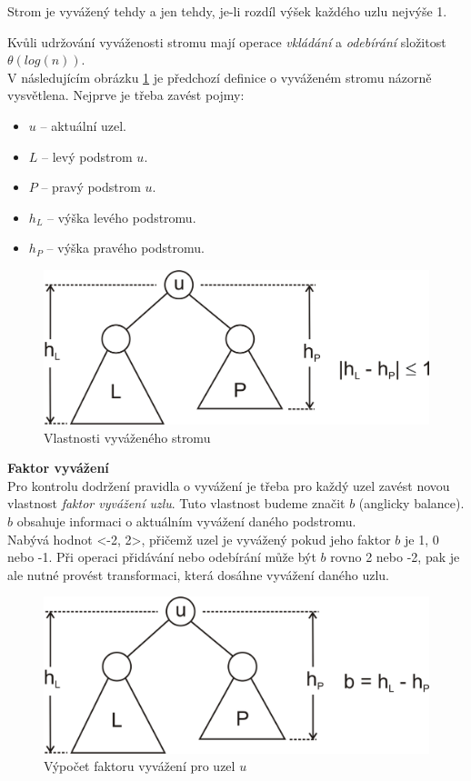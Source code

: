 \documentclass[
  biblatex=false,
  font=serif,
  glossaries=false,
  tables=false,
  theorems=false,
  index
]{kidiplom}
\begin{document}
\begin{definition}
Strom je vyvážený tehdy a jen tehdy, je-li rozdíl výšek každého uzlu nejvýše 1.\cite{Adelson}\cite{dvorsky}
\end{definition}

\noindent Kvůli udržování vyváženosti stromu mají operace \textit{vkládání} a \textit{odebírání} složitost $\theta(log (n))$.\\
\newpage
\noindent V následujícím obrázku \ref{vyvazenyStrom} je předchozí definice o vyváženém stromu názorně vysvětlena. Nejprve je třeba zavést pojmy:
\begin{itemize}
\item $u$ -- aktuální uzel.
\item $L$ -- levý podstrom $u$.
\item $P$ -- pravý podstrom $u$.
\item $h_L$ -- výška levého podstromu.
\item $h_P$ -- výška pravého podstromu.
\end{itemize}

\begin{figure}[h!]
\centering
	\includegraphics[scale=0.3]{obrazky/8AVLVyvazenyStrom.png}
	\caption{Vlastnosti vyváženého stromu}
	\label{vyvazenyStrom}
\end{figure}

\noindent\textbf{Faktor vyvážení}\\
\indent Pro kontrolu dodržení pravidla o vyvážení je třeba pro každý uzel zavést novou vlastnost \textit{faktor vyvážení uzlu}. Tuto vlastnost budeme značit $b$ (anglicky balance). $b$ obsahuje informaci o aktuálním vyvážení daného podstromu.\\ 
\indent Nabývá hodnot <-2, 2>, přičemž uzel je vyvážený pokud jeho faktor $b$ je 1, 0 nebo -1. Při operaci přidávání nebo odebírání může být $b$ rovno 2 nebo -2, pak je ale nutné provést transformaci, která dosáhne vyvážení daného uzlu.

\begin{figure}[h!]
\centering
	\includegraphics[scale=0.3]{obrazky/9AVLFaktor.png}
	\caption{Výpočet faktoru vyvážení pro uzel $u$}
\end{figure}
\end{document}

